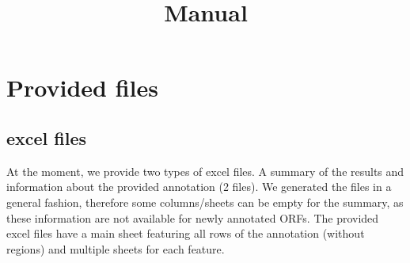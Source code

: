 \documentclass[10pt,a4paper]{article}
\title{Manual}
\begin{document}
\maketitle

\section*{Provided files}

\subsection*{excel files}
At the moment, we provide two types of excel files. A summary of the results and information about the provided annotation (2 files). We generated the files in a general fashion, therefore some columns/sheets can be empty for the summary, as these information are not available for newly annotated ORFs.
The provided excel files have a main sheet featuring all rows of the annotation (without regions) and multiple sheets for each feature.
\end{document}

